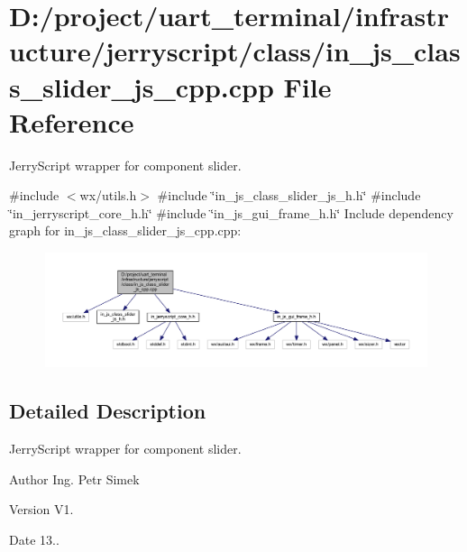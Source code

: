 \section{D\+:/project/uart\+\_\+terminal/infrastructure/jerryscript/class/in\+\_\+js\+\_\+class\+\_\+slider\+\_\+js\+\_\+cpp.cpp File Reference}
\label{in__js__class__slider__js__cpp_8cpp}


Jerry\+Script wrapper for component slider.  


{\ttfamily \#include $<$wx/utils.\+h$>$}\newline
{\ttfamily \#include \char`\"{}in\+\_\+js\+\_\+class\+\_\+slider\+\_\+js\+\_\+h.\+h\char`\"{}}\newline
{\ttfamily \#include \char`\"{}in\+\_\+jerryscript\+\_\+core\+\_\+h.\+h\char`\"{}}\newline
{\ttfamily \#include \char`\"{}in\+\_\+js\+\_\+gui\+\_\+frame\+\_\+h.\+h\char`\"{}}\newline
Include dependency graph for in\+\_\+js\+\_\+class\+\_\+slider\+\_\+js\+\_\+cpp.\+cpp\+:\nopagebreak
\begin{figure}[H]
\begin{center}
\leavevmode
\includegraphics[width=350pt]{in__js__class__slider__js__cpp_8cpp__incl}
\end{center}
\end{figure}


\subsection{Detailed Description}
Jerry\+Script wrapper for component slider. 

\begin{DoxyAuthor}{Author}
Ing. Petr Simek 
\end{DoxyAuthor}
\begin{DoxyVersion}{Version}
V1. 
\end{DoxyVersion}
\begin{DoxyDate}{Date}
13.. 
\end{DoxyDate}
